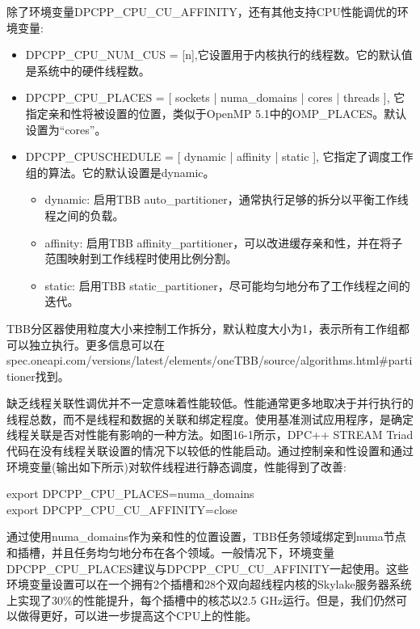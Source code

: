 除了环境变量DPCPP\_CPU\_CU\_AFFINITY，还有其他支持CPU性能调优的环境变量:\par

\begin{itemize}
	\item DPCPP\_CPU\_NUM\_CUS = [n],它设置用于内核执行的线程数。它的默认值是系统中的硬件线程数。
	\item DPCPP\_CPU\_PLACES = [ sockets | numa\_domains | 	cores | threads ], 它指定亲和性将被设置的位置，类似于OpenMP 5.1中的OMP\_PLACES。默认设置为“cores”。
	\item DPCPP\_CPUSCHEDULE = [ dynamic | affinity | static ], 它指定了调度工作组的算法。它的默认设置是dynamic。
	\begin{itemize}
		\item dynamic: 启用TBB auto\_partitioner，通常执行足够的拆分以平衡工作线程之间的负载。
		\item affinity: 启用TBB affinity\_partitioner，可以改进缓存亲和性，并在将子范围映射到工作线程时使用比例分割。
		\item static: 启用TBB static\_partitioner，尽可能均匀地分布了工作线程之间的迭代。
	\end{itemize}
\end{itemize}

TBB分区器使用粒度大小来控制工作拆分，默认粒度大小为1，表示所有工作组都可以独立执行。更多信息可以在spec.oneapi.com/versions/latest/elements/oneTBB/source/algorithms.html\#partitioner找到。\par

缺乏线程关联性调优并不一定意味着性能较低。性能通常更多地取决于并行执行的线程总数，而不是线程和数据的关联和绑定程度。使用基准测试应用程序，是确定线程关联是否对性能有影响的一种方法。如图16-1所示，DPC++ STREAM Triad代码在没有线程关联设置的情况下以较低的性能启动。通过控制亲和性设置和通过环境变量(输出如下所示)对软件线程进行静态调度，性能得到了改善:\par

\begin{tcolorbox}[colback=white,colframe=black]
export DPCPP\_CPU\_PLACES=numa\_domains\\
export DPCPP\_CPU\_CU\_AFFINITY=close
\end{tcolorbox}

通过使用numa\_domains作为亲和性的位置设置，TBB任务领域绑定到numa节点和插槽，并且任务均匀地分布在各个领域。一般情况下，环境变量DPCPP\_CPU\_PLACES建议与DPCPP\_CPU\_CU\_AFFINITY一起使用。这些环境变量设置可以在一个拥有2个插槽和28个双向超线程内核的Skylake服务器系统上实现了30\%的性能提升，每个插槽中的核芯以2.5 GHz运行。但是，我们仍然可以做得更好，可以进一步提高这个CPU上的性能。\par

